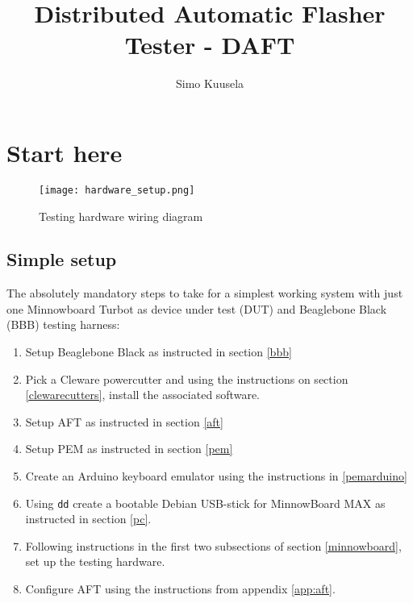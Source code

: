 \documentclass[a4paper,11pt]{article}
\newcommand{\cmd}[1]{\texttt{#1}}
\begin{document}


\title{Distributed Automatic Flasher Tester - DAFT}
\author{
	Simo Kuusela
}
\maketitle

\pagebreak

\tableofcontents

\pagebreak

\section{Start here}

\begin{figure}[h]
	\centering
	\texttt{[image: hardware\_setup.png]}
	\caption{Testing hardware wiring diagram}
\end{figure}

\subsection{Simple setup}
The absolutely mandatory steps to take for a simplest working system with just one Minnowboard Turbot as device under test (DUT) and Beaglebone Black (BBB) testing harness:
\begin{enumerate}
	\item Setup Beaglebone Black as instructed in section \ref{bbb}
	\item Pick a Cleware powercutter and using the instructions on section \ref{clewarecutters}, install the associated software.
	\item Setup AFT as instructed in section \ref{aft}
	\item Setup PEM as instructed in section \ref{pem}
	\item Create an Arduino keyboard emulator using the instructions in \ref{pemarduino}
	\item Using \cmd{dd} create a bootable Debian USB-stick for MinnowBoard MAX as instructed in section \ref{pc}.
	\item Following instructions in the first two subsections of section \ref{minnowboard}, set up the testing hardware.
	\item Configure AFT using the instructions from appendix \ref{app:aft}.
\end{enumerate}
\end{document}
